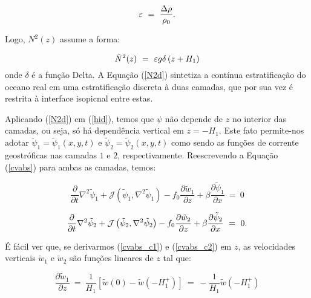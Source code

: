 \begin{equation}
\varepsilon \ = \ \frac{\Delta \rho}{\rho_0}.
\label{eps}
\vspace{0.5cm}
\end{equation}

Logo, $N^2(z)$ assume a forma:

\begin{equation}
\tilde{N}^2(z) \ = \ \varepsilon g \delta \left ( z + H_1 \right )
\label{N2d}
\vspace{0.5cm}
\end{equation}
onde $\delta$ é a função Delta. A Equação (\ref{N2d}) sintetiza a contínua 
estratificação do oceano real em uma estratificação discreta à duas camadas, que por sua vez 
é restrita à interface isopicnal entre estas.

Aplicando (\ref{N2d}) em (\ref{hid}), temos que $\psi$ não depende de $z$ no interior das camadas, 
ou seja, só há dependência vertical em $z = -H_1$. Este fato permite-nos adotar 
$\tilde{\psi}_1 = \tilde{\psi}_1(x,y,t)$ e $\tilde{\psi}_2 = \tilde{\psi}_2(x,y,t)$ como sendo as 
funções de corrente geostróficas nas camadas $1$ e $2$, respectivamente. Reescrevendo a Equação 
(\ref{cvabs}) para ambas as camadas, temos:

\begin{equation}
\frac{\partial}{\partial t} \nabla^2 \tilde{\psi}_1 + \mathcal{J} \left ( \tilde{\psi}_1,\nabla^2 \tilde{\psi}_1 \right ) - f_0 \frac{\partial \tilde{w}_1}{\partial z} + \beta \frac{\partial \tilde{\psi}_1}{\partial x} \ = \ 0
\label{cvabs_c1}
\end{equation}

\begin{equation}
\frac{\partial}{\partial t} \nabla^2 \tilde{\psi}_2 + \mathcal{J} \left ( \tilde{\psi}_2,\nabla^2 \tilde{\psi}_2 \right ) - f_0 \frac{\partial \tilde{w}_2}{\partial z} + \beta \frac{\partial \tilde{\psi}_2}{\partial x} \ = \ 0.
\label{cvabs_c2}
\vspace{0.5cm}
\end{equation}

É fácil ver que, se derivarmos (\ref{cvabs_c1}) e (\ref{cvabs_c2}) em $z$, as velocidades verticais 
$\tilde{w}_1$ e $\tilde{w}_2$ são funções lineares de $z$ tal que:

\begin{equation}
\frac{\partial \tilde{w}_1}{\partial z} \ = \ \frac{1}{H_1}\left [ \tilde{w} \left ( 0 \right ) - \tilde{w} \left ( -H_1^{+} \right ) \right ] \ = \ - \frac{1}{H_1} \tilde{w} \left ( -H_1^{+} \right )
\label{w1}
\end{equation}

